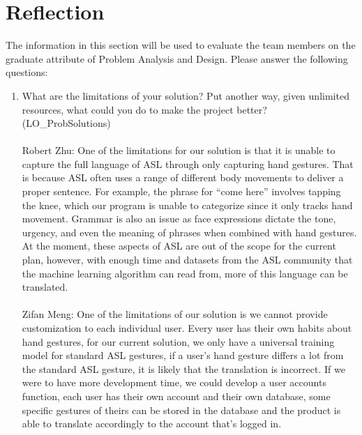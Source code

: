 \documentclass[12pt, titlepage]{article}
\begin{document}

\section{Reflection}

The information in this section will be used to evaluate the team members on the
graduate attribute of Problem Analysis and Design.  Please answer the following questions:

\begin{enumerate}
  \item What are the limitations of your solution?  Put another way, given
  unlimited resources, what could you do to make the project better? (LO\_ProbSolutions)
  ~\\
  \\
  Robert Zhu: One of the limitations for our solution is that it is unable to capture the full language of ASL through only capturing hand gestures. 
  That is because ASL often uses a range of different body movements to deliver a proper sentence. For example, the phrase for “come here” involves 
  tapping the knee, which our program is unable to categorize since it only tracks hand movement. Grammar is also an issue as face expressions dictate 
  the tone, urgency, and even the meaning of phrases when combined with hand gestures. At the moment, these aspects of ASL are out of the scope for the 
  current plan, however, with enough time and datasets from the ASL community that the machine learning algorithm can read from, more of this language 
  can be translated.\\
  \\
  Zifan Meng: One of the limitations of our solution is we cannot provide customization to each individual user. Every user has their own habits about hand gestures, for our current solution, we only have a universal training model for standard ASL gestures, if a user’s hand gesture differs a lot from the standard ASL gesture, it is likely that the translation is incorrect. If we were to have more development time, we could develop a user accounts function, each user has their own account and their own database, some specific gestures of theirs can be stored in the database and the product is able to translate accordingly to the account that’s logged in.\\
    ~\\

\end{enumerate}
\end{document}
